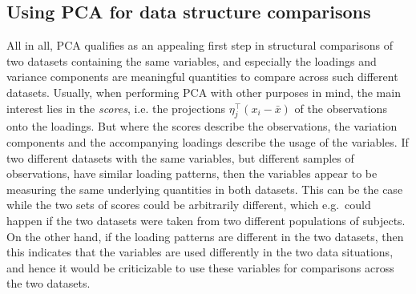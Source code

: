 \documentclass[titlepage,11pt,twoside]{article}
\begin{document}
\subsection{Using PCA for data structure comparisons}
All in all, PCA qualifies as an appealing first step in structural comparisons of two datasets containing the same variables, and especially the loadings and variance components are meaningful quantities to compare across such different datasets. Usually, when performing PCA with other purposes in mind, the main interest lies in the \textit{scores}, i.e. the projections $\eta_j^\top (x_i - \bar{x})$ of the observations onto the loadings. But where the scores describe the observations, the variation components and the accompanying loadings describe the usage of the variables. If two different datasets with the same variables, but different samples of observations, have similar loading patterns, then the variables appear to be measuring the same underlying quantities in both datasets. This can be the case while the two sets of scores could be arbitrarily different, which e.g.\ could happen if the two datasets were taken from two different populations of subjects. On the other hand, if the loading patterns are different in the two datasets, then this indicates that the variables are used differently in the two data situations, and hence it would be criticizable to use these variables for comparisons across the two datasets.
\end{document}
